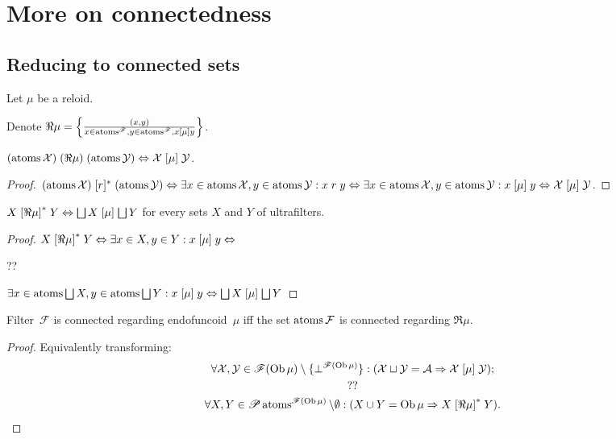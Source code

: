 \chapter{More on connectedness}

\section{Reducing to connected sets}

Let $\mu$ be a reloid.

Denote $\Re \mu = \left\{ \frac{ (x, y) }{ x \in
\operatorname{atoms}^{\mathscr{F}}, y \in \operatorname{atoms}^{\mathscr{F}}, x
\mathrel{[\mu]} y }\right\}$.

\begin{prop}
$(\operatorname{atoms} \mathcal{X}) \mathrel{(\Re \mu)} (\operatorname{atoms}
\mathcal{Y}) \Leftrightarrow \mathcal{X} \mathrel{[\mu]} \mathcal{Y}$.
\end{prop}

\begin{proof}
$(\operatorname{atoms} \mathcal{X}) \mathrel{[r]^{\ast}} (\operatorname{atoms}
\mathcal{Y}) \Leftrightarrow \exists x \in \operatorname{atoms} \mathcal{X}, y \in
\operatorname{atoms} \mathcal{Y} : x \mathrel{r} y \Leftrightarrow \exists x \in
\operatorname{atoms} \mathcal{X}, y \in \operatorname{atoms} \mathcal{Y} : x \mathrel{[\mu]} y
\Leftrightarrow \mathcal{X} \mathrel{[\mu]} \mathcal{Y}$.
\end{proof}

\begin{prop}
$X\rsuprel{\Re\mu}Y \Leftrightarrow
\bigsqcup X\suprel{\mu}\bigsqcup Y$ for every sets
$X$ and $Y$ of ultrafilters.
\end{prop}

\begin{proof}
$X\mathrel{\left[\Re\mu\right]^{\ast}}Y \Leftrightarrow
\exists x\in X,y\in Y: x\mathrel{\left[\mu\right]}y \Leftrightarrow$

??

$\exists x\in\atoms\bigsqcup X, y\in\atoms \bigsqcup Y:
x\suprel{\mu}y \Leftrightarrow
\bigsqcup X\suprel{\mu}\bigsqcup Y$
\end{proof}

\begin{thm}
Filter~$\mathcal{F}$ is connected regarding endofuncoid~$\mu$ iff the set
$\operatorname{atoms}\mathcal{F}$ is connected regarding $\Re \mu$.
\end{thm}

\begin{proof}
Equivalently transforming:
\begin{gather*}
\forall\mathcal{X},\mathcal{Y}\in\mathscr{F}(\operatorname{Ob}\mu)\setminus\{\bot^{\mathscr{F}(\operatorname{Ob}\mu)}\}:(\mathcal{X}\sqcup\mathcal{Y}=\mathcal{A}\Rightarrow\mathcal{X}\mathrel{\left[\mu\right]}\mathcal{Y}); \\
?? \\
\forall X,Y\in\mathscr{P}\operatorname{atoms}^{\mathscr{F}(\operatorname{Ob}\mu)}\setminus\emptyset:
(X\cup Y=\operatorname{Ob}\mu \Rightarrow X\mathrel{\left[\Re\mu\right]^{\ast}}Y).
\end{gather*}
\end{proof}

